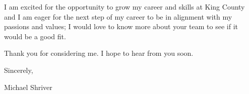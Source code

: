 \documentclass[10pt,oneside]{article}
\begin{document}
\vspace{\baselineskip}

I am excited for the opportunity to grow my career and skills at King County and I am eager for the next step of my career to be in alignment with my passions and values; I would love to know more about your team to see if it would be a good fit.

\vspace{\baselineskip}

Thank you for considering me. I hope to hear from you soon.

\vspace{\baselineskip}

Sincerely,

\vspace{\baselineskip}

Michael Shriver
\end{document}
